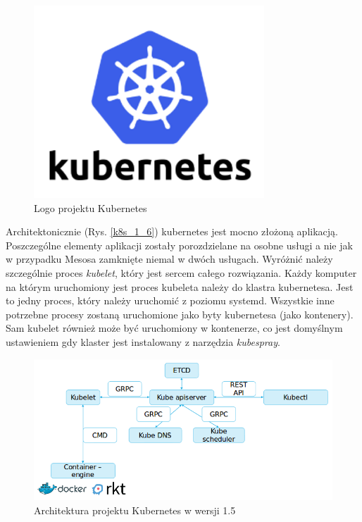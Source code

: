 \documentclass[10pt,a4paper,titlepage,twoside]{report}
\begin{document}
\begin{figure}[!h]
	\centering
	\includegraphics[scale=1]{pics/Kubernetes-logo.png}
	\caption{Logo projektu Kubernetes}
	\label{kube_logo}
\end{figure}

Architektonicznie (Rys. \ref{k8s_1_6}) kubernetes jest mocno złożoną aplikacją. Poszczególne elementy aplikacji zostały porozdzielane na osobne usługi a nie jak w przypadku Mesosa zamknięte niemal w dwóch usługach. Wyróżnić należy szczególnie proces \textit{kubelet}, który jest sercem całego rozwiązania. Każdy komputer na którym uruchomiony jest proces kubeleta należy do klastra kubernetesa. Jest to jedny proces, który należy uruchomić z poziomu systemd. Wszystkie inne potrzebne procesy zostaną uruchomione jako byty kubernetesa (jako kontenery). Sam kubelet również może być uruchomiony w kontenerze, co jest domyślnym ustawieniem gdy klaster jest instalowany z narzędzia \textit{kubespray}. 

\begin{figure}[!h]
	\centering
	\includegraphics[scale=0.7]{pics/k8s_1_5.png}
	\caption{Architektura projektu Kubernetes w wersji 1.5}
	\label{k8s_1_5}
\end{figure}
\end{document}
